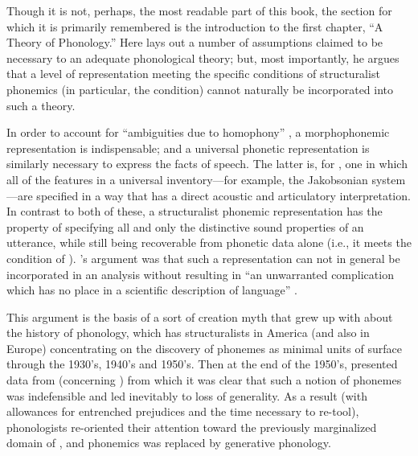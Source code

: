 Though it is not, perhaps, the most readable part of this book, the
section for which it is primarily remembered is the introduction to
the first chapter, ``A Theory of Phonology.'' Here {\Halle} lays out a
number of assumptions claimed to be necessary to an adequate
phonological theory; but, most importantly, he argues that a level of
representation meeting the specific conditions of structuralist
phonemics (in particular, the  condition) cannot
naturally be incorporated into such a theory.

In order to account for ``ambiguities due to homophony''
\citep[23]{halle:spr}, a morphophonemic representation is
indispensable; and a universal phonetic representation is similarly
necessary to express the facts of speech. The latter is, for {\Halle},
one in which all of the features in a universal inventory—for example,
the Jakobsonian system—are specified in a way that has a direct
acoustic and articulatory interpretation. In {contrast} to both of
these, a structuralist phonemic representation has the property of
specifying all and only the distinctive sound properties of an
utterance, while still being recoverable from phonetic data alone
(i.e., it meets the condition of ). {\Halle}'s argument was
that such a representation can not in general be incorporated in an
analysis without resulting in ``an unwarranted complication which has
no place in a scientific description of language''
\citep[24]{halle:spr}.

This argument is the basis of a sort of creation myth that grew up
with about the history of phonology, which has structuralists in
America (and also in Europe) concentrating on the discovery of
phonemes as minimal units of surface  through the 1930's,
1940's and 1950's. Then at the end of the 1950's, {\Halle} presented data
from  (concerning  ) from which it was clear
that such a notion of phonemes was indefensible and led inevitably to
loss of generality. As a result (with allowances for entrenched
prejudices and the time necessary to re-tool), phonologists
re-oriented their attention toward the previously marginalized domain
of , and phonemics was replaced by generative
phonology.

